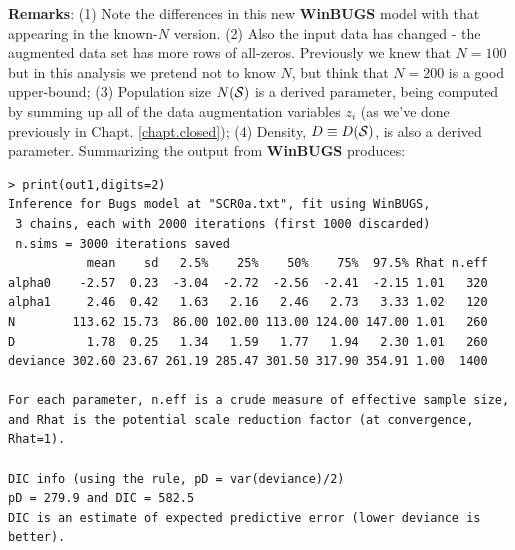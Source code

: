 {\bf Remarks}:  (1) Note the differences in this new {\bf WinBUGS} model
with that appearing in the known-$N$ version.  (2) Also the input data
has changed - the augmented data set has more rows of
all-zeros. Previously we knew that $N=100$ but in this analysis we
pretend not to know $N$, but think that $N=200$ is a good upper-bound;
(3) Population size $N({\cal S})$ is a derived parameter, being computed by
summing up all of the data augmentation variables $z_{i}$ (as we've
done previously in Chapt. \ref{chapt.closed}); (4) Density, $D\equiv D({\cal S})$, is also a derived
parameter. Summarizing the output from {\bf WinBUGS} produces:
{\small
\begin{verbatim}
> print(out1,digits=2)
Inference for Bugs model at "SCR0a.txt", fit using WinBUGS,
 3 chains, each with 2000 iterations (first 1000 discarded)
 n.sims = 3000 iterations saved
           mean    sd   2.5%    25%    50%    75%  97.5% Rhat n.eff
alpha0    -2.57  0.23  -3.04  -2.72  -2.56  -2.41  -2.15 1.01   320
alpha1     2.46  0.42   1.63   2.16   2.46   2.73   3.33 1.02   120
N        113.62 15.73  86.00 102.00 113.00 124.00 147.00 1.01   260
D          1.78  0.25   1.34   1.59   1.77   1.94   2.30 1.01   260
deviance 302.60 23.67 261.19 285.47 301.50 317.90 354.91 1.00  1400

For each parameter, n.eff is a crude measure of effective sample size,
and Rhat is the potential scale reduction factor (at convergence, Rhat=1).

DIC info (using the rule, pD = var(deviance)/2)
pD = 279.9 and DIC = 582.5
DIC is an estimate of expected predictive error (lower deviance is better).
\end{verbatim}
}

